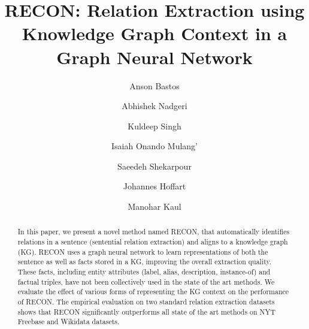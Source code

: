 \documentclass[sigconf]{acmart}
\begin{document}


\title{RECON: Relation Extraction using Knowledge Graph Context in a Graph Neural Network}



\author{Anson Bastos}

\author{Abhishek Nadgeri}



\author{Kuldeep Singh}

\author{Isaiah Onando Mulang'}

\author{Saeedeh Shekarpour}

\author{Johannes Hoffart}

\author{Manohar Kaul}
\renewcommand{\shortauthors}{Bastos, et al.}




















\begin{abstract}
In this paper, we present a novel method named RECON, that automatically identifies relations in a sentence (sentential relation extraction) and aligns to a knowledge graph (KG). RECON uses a graph neural network to learn representations of both the sentence as well as facts stored in a KG, improving the overall extraction quality. These facts, including entity attributes (label, alias, description, instance-of) and factual triples, have not been collectively used in the state of the art methods. We evaluate the effect of various forms of representing the KG context on the performance of RECON. The empirical evaluation on two standard relation extraction datasets shows that RECON significantly outperforms all state of the art methods on NYT Freebase and Wikidata datasets.

\end{abstract}
\end{document}
